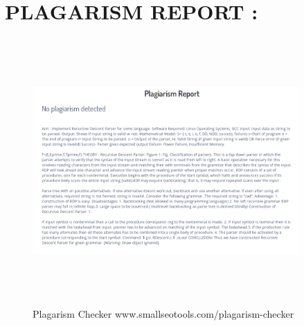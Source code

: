 \documentclass[11pt]{article}
\begin{document}
	\section{PLAGARISM REPORT :}
	\begin{figure}[h!]
		\centering
		\includegraphics[height=4in,width=4in]{plagiarism2.png}
		\caption{Plagarism Checker www.smallseotools.com/plagarism-checker}
	\end{figure}
	\newpage
\end{document}

